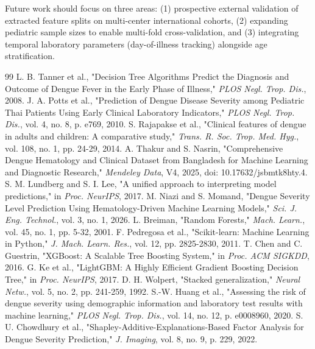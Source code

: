 \documentclass[conference]{IEEEtran}
\begin{document}
Future work should focus on three areas: (1) prospective external validation of extracted feature splits on multi-center international cohorts, (2) expanding pediatric sample sizes to enable multi-fold cross-validation, and (3) integrating temporal laboratory parameters (day-of-illness tracking) alongside age stratification.

\begin{thebibliography}{99}
 L. B. Tanner et al., "Decision Tree Algorithms Predict the Diagnosis and Outcome of Dengue Fever in the Early Phase of Illness," \textit{PLOS Negl. Trop. Dis.}, 2008.
 J. A. Potts et al., "Prediction of Dengue Disease Severity among Pediatric Thai Patients Using Early Clinical Laboratory Indicators," \textit{PLOS Negl. Trop. Dis.}, vol. 4, no. 8, p. e769, 2010.
 S. Rajapakse et al., "Clinical features of dengue in adults and children: A comparative study," \textit{Trans. R. Soc. Trop. Med. Hyg.}, vol. 108, no. 1, pp. 24-29, 2014.
 A. Thakur and S. Nasrin, "Comprehensive Dengue Hematology and Clinical Dataset from Bangladesh for Machine Learning and Diagnostic Research," \textit{Mendeley Data}, V4, 2025, doi: 10.17632/jsbmtk8hty.4.
 S. M. Lundberg and S. I. Lee, "A unified approach to interpreting model predictions," in \textit{Proc. NeurIPS}, 2017.
 M. Niazi and S. Momand, "Dengue Severity Level Prediction Using Hematology-Driven Machine Learning Models," \textit{Sci. J. Eng. Technol.}, vol. 3, no. 1, 2026.
 L. Breiman, "Random Forests," \textit{Mach. Learn.}, vol. 45, no. 1, pp. 5-32, 2001.
 F. Pedregosa et al., "Scikit-learn: Machine Learning in Python," \textit{J. Mach. Learn. Res.}, vol. 12, pp. 2825-2830, 2011.
 T. Chen and C. Guestrin, "XGBoost: A Scalable Tree Boosting System," in \textit{Proc. ACM SIGKDD}, 2016.
 G. Ke et al., "LightGBM: A Highly Efficient Gradient Boosting Decision Tree," in \textit{Proc. NeurIPS}, 2017.
 D. H. Wolpert, "Stacked generalization," \textit{Neural Netw.}, vol. 5, no. 2, pp. 241-259, 1992.
 S.-W. Huang et al., "Assessing the risk of dengue severity using demographic information and laboratory test results with machine learning," \textit{PLOS Negl. Trop. Dis.}, vol. 14, no. 12, p. e0008960, 2020.
 S. U. Chowdhury et al., "Shapley-Additive-Explanations-Based Factor Analysis for Dengue Severity Prediction," \textit{J. Imaging}, vol. 8, no. 9, p. 229, 2022.

\end{thebibliography}
\end{document}
